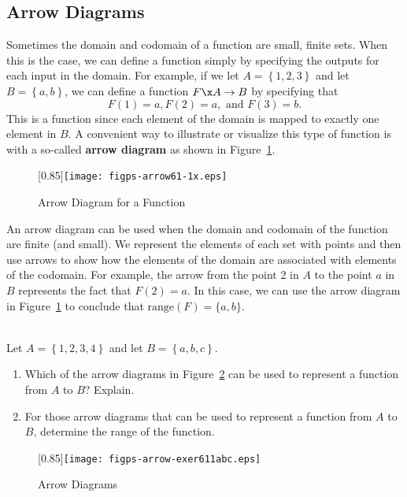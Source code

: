 \subsection*{Arrow Diagrams}
Sometimes the domain and codomain of a function are small, finite sets.  When this is the case, we can define a function simply by specifying the outputs for each input in the domain.  For example, if we let
 $A = \left\{ {1, 2, 3} \right\}$  and let  $B = \left\{ {a, b} \right\}$, we can define a function  
$F\x A \to B$ by specifying that 
\[
F( 1 ) = a, F( 2 ) = a, \text{ and }  F( 3 ) = b.
\]
%
This is a function since each element of the domain is mapped to exactly one element in  $B$.  A convenient way to illustrate or visualize this type of function is with a so-called \textbf{arrow diagram}
%
 as shown in Figure~\ref{fig:arrow61-1}.
\begin{figure}[h]
\begin{center}
\scalebox{0.85}[0.85]{\texttt{[image: figps-arrow61-1x.eps]}} 
\caption{Arrow Diagram for a Function} \label{fig:arrow61-1}
\end{center}
\end{figure}
An arrow diagram can be used when the domain and codomain of the function are finite (and small).  We represent the elements of each set with points and then use arrows to show how the elements of the domain are associated with elements of the codomain.  For example, the arrow from the point  2  in  $A$  to the point  $a$  in  $B$  represents the fact that  $F( 2 ) = a$.  In this case, we can use the arrow diagram in 
Figure~\ref{fig:arrow61-1} to conclude that $\text{range} (F) = \{ a, b \}$.
\hbreak

\begin{prog} \label{pr:arrow} \hfill \\
Let  $A = \left\{ {1, 2, 3, 4} \right\}$ and let  $B = \left\{ {a, b, c} \right\}$.  
\begin{enumerate}
  \item Which of the arrow diagrams in Figure~\ref{fig:arrow61-2} can be used to represent a function from  $A$  to  $B$?  Explain. \label{exer:sec61-1}
  \item For those arrow diagrams that can be used to represent a function from $A$ to $B$, determine the range of the function.
\end{enumerate}
\begin{figure}[h]
\begin{center}
\scalebox{0.85}[0.85]{\texttt{[image: figps-arrow-exer611abc.eps]}} 
\caption{Arrow Diagrams} \label{fig:arrow61-2}
\end{center}
\end{figure}
\end{prog}
\endinput
